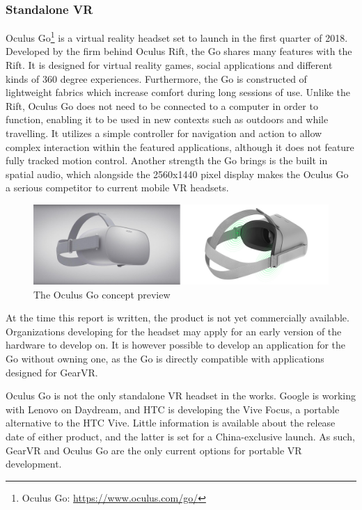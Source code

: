 		
		\subsubsection{Standalone VR}
		Oculus Go\footnote{Oculus Go: \url{https://www.oculus.com/go/}} is a virtual reality headset set to launch in the first quarter of 2018. Developed by the firm behind Oculus Rift, the Go shares many features with the Rift. It is designed for virtual reality games, social applications and different kinds of 360 degree experiences. Furthermore, the Go is constructed of lightweight fabrics which increase comfort during long sessions of use. Unlike the Rift, Oculus Go does not need to be connected to a computer in order to function, enabling it to be used in new contexts such as outdoors and while travelling. It utilizes a simple controller for navigation and action to allow complex interaction within the featured applications, although it does not feature fully tracked motion control. Another strength the Go brings is the built in spatial audio, which alongside the 2560x1440 pixel display makes the Oculus Go a serious competitor to current mobile VR headsets.  \\
		\begin{figure}[H]
			\centering
			\includegraphics[width=1.0\linewidth]{figure/Analysis/oculusgo}
			\caption{The Oculus Go concept preview}
			\label{fig:Oculus}
		\end{figure}
		
		At the time this report is written, the product is not yet commercially available. Organizations developing for the headset may apply for an early version of the hardware to develop on. It is however possible to develop an application for the Go without owning one, as the Go is directly compatible with applications designed for GearVR. 
		
		Oculus Go is not the only standalone VR headset in the works. Google is working with Lenovo on Daydream, and HTC is developing the Vive Focus, a portable alternative to the HTC Vive. Little information is available about the release date of either product, and the latter is set for a China-exclusive launch. As such, GearVR and Oculus Go are the only current options for portable VR development. 
		
